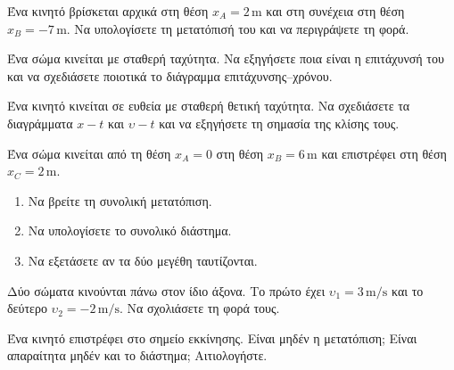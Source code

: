 \begin{exercise}[PHY-A-001]{}
Ένα κινητό βρίσκεται αρχικά στη θέση \(x_A=2\,\mathrm m\) και στη συνέχεια στη θέση \(x_B=-7\,\mathrm m\). Να υπολογίσετε τη μετατόπισή του και να περιγράψετε τη φορά.
\end{exercise}
\begin{exercise}[PHY-A-002]{}
Ένα σώμα κινείται με σταθερή ταχύτητα. Να εξηγήσετε ποια είναι η επιτάχυνσή του και να σχεδιάσετε ποιοτικά το διάγραμμα επιτάχυνσης–χρόνου.
\end{exercise}
\begin{exercise}[PHY-A-003]{}
Ένα κινητό κινείται σε ευθεία με σταθερή θετική ταχύτητα. Να σχεδιάσετε τα διαγράμματα $x-t$ και $\upsilon-t$ και να εξηγήσετε τη σημασία της κλίσης τους.
\end{exercise}
\begin{exercise}[PHY-A-004]{}
Ένα σώμα κινείται από τη θέση $x_A=0$ στη θέση $x_B=6\,\mathrm m$ και επιστρέφει στη θέση $x_C=2\,\mathrm m$.
\begin{enumerate}[label=\BookGreek*),leftmargin=18pt,itemsep=0pt]
\item Να βρείτε τη συνολική μετατόπιση.
\item Να υπολογίσετε το συνολικό διάστημα.
\item Να εξετάσετε αν τα δύο μεγέθη ταυτίζονται.
\end{enumerate}
\end{exercise}
\begin{exercise}[PHY-A-005]{}
Δύο σώματα κινούνται πάνω στον ίδιο άξονα. Το πρώτο έχει $\upsilon_1=3\,\mathrm{m/s}$ και το δεύτερο $\upsilon_2=-2\,\mathrm{m/s}$. Να σχολιάσετε τη φορά τους.
\end{exercise}
\begin{exercise}[PHY-A-006]{}
Ένα κινητό επιστρέφει στο σημείο εκκίνησης. Είναι μηδέν η μετατόπιση; Είναι απαραίτητα μηδέν και το διάστημα; Αιτιολογήστε.
\end{exercise}

